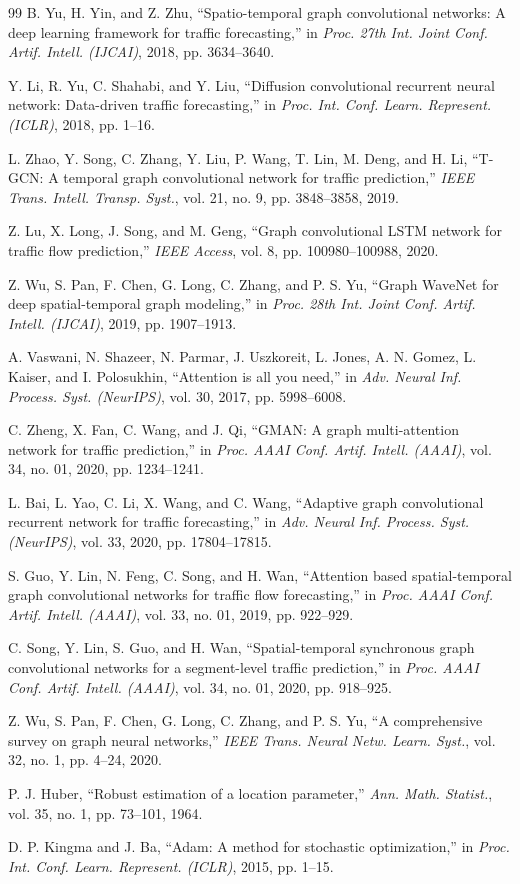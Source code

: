 \begin{thebibliography}{99}
B. Yu, H. Yin, and Z. Zhu, ``Spatio-temporal graph convolutional networks: A deep learning framework for traffic forecasting,'' in \emph{Proc. 27th Int. Joint Conf. Artif. Intell. (IJCAI)}, 2018, pp. 3634--3640.

Y. Li, R. Yu, C. Shahabi, and Y. Liu, ``Diffusion convolutional recurrent neural network: Data-driven traffic forecasting,'' in \emph{Proc. Int. Conf. Learn. Represent. (ICLR)}, 2018, pp. 1--16.

L. Zhao, Y. Song, C. Zhang, Y. Liu, P. Wang, T. Lin, M. Deng, and H. Li, ``T-GCN: A temporal graph convolutional network for traffic prediction,'' \emph{IEEE Trans. Intell. Transp. Syst.}, vol. 21, no. 9, pp. 3848--3858, 2019.

Z. Lu, X. Long, J. Song, and M. Geng, ``Graph convolutional LSTM network for traffic flow prediction,'' \emph{IEEE Access}, vol. 8, pp. 100980--100988, 2020.

Z. Wu, S. Pan, F. Chen, G. Long, C. Zhang, and P. S. Yu, ``Graph WaveNet for deep spatial-temporal graph modeling,'' in \emph{Proc. 28th Int. Joint Conf. Artif. Intell. (IJCAI)}, 2019, pp. 1907--1913.

A. Vaswani, N. Shazeer, N. Parmar, J. Uszkoreit, L. Jones, A. N. Gomez, L. Kaiser, and I. Polosukhin, ``Attention is all you need,'' in \emph{Adv. Neural Inf. Process. Syst. (NeurIPS)}, vol. 30, 2017, pp. 5998--6008.

C. Zheng, X. Fan, C. Wang, and J. Qi, ``GMAN: A graph multi-attention network for traffic prediction,'' in \emph{Proc. AAAI Conf. Artif. Intell. (AAAI)}, vol. 34, no. 01, 2020, pp. 1234--1241.

L. Bai, L. Yao, C. Li, X. Wang, and C. Wang, ``Adaptive graph convolutional recurrent network for traffic forecasting,'' in \emph{Adv. Neural Inf. Process. Syst. (NeurIPS)}, vol. 33, 2020, pp. 17804--17815.

S. Guo, Y. Lin, N. Feng, C. Song, and H. Wan, ``Attention based spatial-temporal graph convolutional networks for traffic flow forecasting,'' in \emph{Proc. AAAI Conf. Artif. Intell. (AAAI)}, vol. 33, no. 01, 2019, pp. 922--929.

C. Song, Y. Lin, S. Guo, and H. Wan, ``Spatial-temporal synchronous graph convolutional networks for a segment-level traffic prediction,'' in \emph{Proc. AAAI Conf. Artif. Intell. (AAAI)}, vol. 34, no. 01, 2020, pp. 918--925.

Z. Wu, S. Pan, F. Chen, G. Long, C. Zhang, and P. S. Yu, ``A comprehensive survey on graph neural networks,'' \emph{IEEE Trans. Neural Netw. Learn. Syst.}, vol. 32, no. 1, pp. 4--24, 2020.

P. J. Huber, ``Robust estimation of a location parameter,'' \emph{Ann. Math. Statist.}, vol. 35, no. 1, pp. 73--101, 1964.

D. P. Kingma and J. Ba, ``Adam: A method for stochastic optimization,'' in \emph{Proc. Int. Conf. Learn. Represent. (ICLR)}, 2015, pp. 1--15.

\end{thebibliography}
